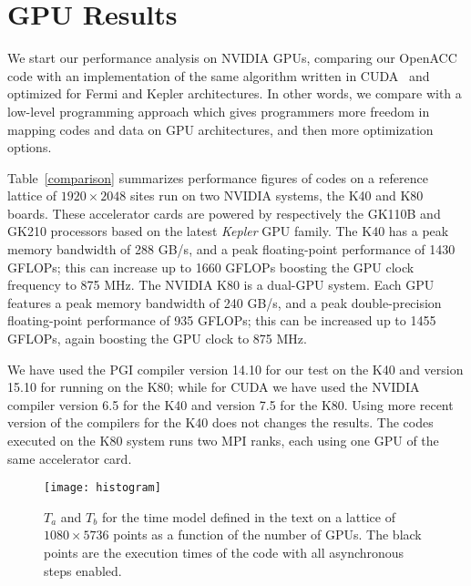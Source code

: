 \documentclass[times]{cpeauth}
\begin{document}
%
\section{GPU Results}\label{sec:results}

We start our performance analysis on NVIDIA GPUs, comparing our OpenACC code 
with an implementation of the same algorithm written in CUDA~\cite{caf11,sbac-pad13} 
and optimized for Fermi and Kepler architectures. In other words, we compare 
with a low-level programming approach which gives programmers more freedom in 
mapping codes and data on GPU architectures, and then more optimization options.

Table~\ref{comparison} summarizes performance figures of codes on a reference 
lattice of $1920 \times 2048$ sites run on two NVIDIA systems, the K40 and K80 
boards. 
%
These accelerator cards are powered by respectively the GK110B and GK210 
processors based on the latest {\em Kepler} GPU family.
%
The K40 has a peak memory bandwidth of 288 GB/s, and a peak floating-point 
performance of 1430 GFLOPs; this can increase up to 
1660 GFLOPs boosting the GPU clock frequency to 875 MHz.
%
The NVIDIA K80 is a dual-GPU system. Each GPU features a peak memory 
bandwidth of 240 GB/s, and a peak double-precision floating-point performance 
of 935 GFLOPs; this can be increased up to 1455 GFLOPs, again
boosting the GPU clock to 875 MHz. 

We have used the PGI compiler version 14.10 for our test on the K40 and 
version 15.10 for running on the K80; while for CUDA we have used the 
NVIDIA compiler version 6.5 for the K40 and version 7.5 for the K80. Using more 
recent version of the compilers for the K40 does not changes the results.
%
The codes executed on the K80 system runs two MPI ranks, each using one 
GPU of the same accelerator card.

%
\begin{figure}
\centering
\texttt{[image: histogram]}
\caption{\label{fig:histo} $T_a$ and $T_b$ for the time model 
defined in the text on a lattice of $1080 \times 5736$ points
as a function of the number of GPUs. 
The black points are the execution times of the code 
with all asynchronous steps enabled.
}
\end{figure}
%
\end{document}
